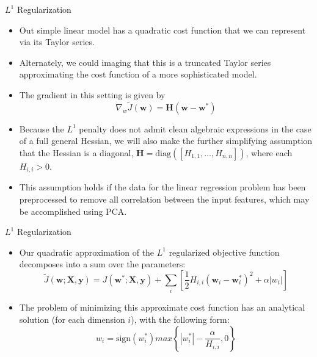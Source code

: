 \documentclass[10pt]{beamer}
\begin{document}
	\begin{frame}{$L^1$ Regularization}
		\begin{itemize}
			\item Out simple linear model has a quadratic cost function that we can represent via its Taylor series.
			\pause
			\item Alternately, we could imaging that this is a truncated Taylor series approximating the cost function of a more sophisticated model. 
			\pause
			\item The gradient in this setting is given by
			$$\nabla_w\tilde{J}(\bm{w})=\mathbf{H}(\bm{w}-\bm{w}^*)$$
			
			\pause
			\item Because the $L^1$ penalty does not admit clean algebraic expressions in the case of a full general Hessian, we will also make the further simplifying assumption that the Hessian is a diagonal, $\mathbf{H}=\mathrm{diag}([H_{1,1},\dots,H_{n,n}])$, where each $H_{i,i}>0$.
			\pause
			\item This assumption holds if the data for the linear regression problem has been preprocessed to remove all correlation between the input features, which may be accomplished using PCA.
		\end{itemize}
	\end{frame}

	\begin{frame}{$L^1$ Regularization}
		\begin{itemize}
			\item Our quadratic approximation of the $L^1$ regularized objective function decomposes into a sum over the parameters:
			$$\tilde{J}(\bm{w};\bm{X},\bm{y})=J(\bm{w}^*;\bm{X},\bm{y})+\sum_i\left[\frac{1}{2}H_{i,i}(\bm{w}_i-\bm{w}_i^*)^2+\alpha\left|w_i\right|\right]$$
			
			\pause
			\item The problem of minimizing this approximate cost function has an analytical solution (for each dimension $i$), with the following form:
			$$w_i=\mathrm{sign}(w_i^*)max\left\{\left|w_i^*\right|-\frac{\alpha}{H_{i,i}}, 0\right\}$$
		\end{itemize}
	\end{frame}
\end{document}
